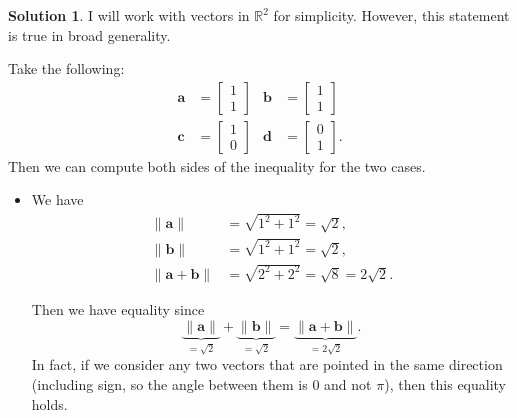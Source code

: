 \documentclass[12pt]{report} %
\newcommand{\R}{\mathbb{R}}
\theoremstyle{definition}
\newtheorem{solution}{Solution}
\begin{document}
\begin{solution}
I will work with vectors in $\R^2$ for simplicity. However, this statement is true in broad generality.

Take the following:
\begin{align*}
    \mathbf{a}&= \begin{bmatrix} 1\\ 1 \end{bmatrix}&
    \mathbf{b}&= \begin{bmatrix} 1\\ 1 \end{bmatrix}\\
    \mathbf{c}&= \begin{bmatrix} 1\\ 0 \end{bmatrix}&
    \mathbf{d}&= \begin{bmatrix} 0\\ 1 \end{bmatrix}.
\end{align*}
Then we can compute both sides of the inequality for the two cases. 
\begin{itemize}
    \item We have
    \begin{align*}
    \|\mathbf{a}\|&=\sqrt{1^2+1^2}=\sqrt{2},\\
    \|\mathbf{b}\|&=\sqrt{1^2+1^2}=\sqrt{2},\\
    \|\mathbf{a}+\mathbf{b}\|&= \sqrt{2^2+2^2}=\sqrt{8}=2\sqrt{2}.
    \end{align*}
        \begin{center}
        \end{center}
    
    Then we have equality since
    \[
    \underbrace{\|\mathbf{a}\|}_{=\sqrt{2}}+\underbrace{\|\mathbf{b}\|}_{=\sqrt{2}}=\underbrace{\|\mathbf{a}+\mathbf{b}\|}_{=2\sqrt{2}}.
    \]
    In fact, if we consider any two vectors that are pointed in the same direction (including sign, so the angle between them is $0$ and not $\pi$), then this equality holds.
    

\end{itemize}
\end{solution}
\end{document}
